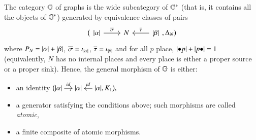 \begin{definition}
    The category $\mathbb G$ of graphs is the wide subcategory  of ${\mathbb G}^*$ (that is, it contains all the objects of ${\mathbb G}^*$) generated by equivalence classes of pairs
    \[
    \bigl(
    \begin{tikzcd}
    \length\alpha \ar[r,"\overline\sigma"] & N & \ar[l,"\overline\tau"'] \length\beta
    \end{tikzcd},
    \Delta_N  \bigr)
    \]
    where $P_N=\lvert \alpha \rvert + \lvert \beta \rvert$, $\overline\sigma=\iota_{\lvert \alpha \rvert}$, $\overline\tau = \iota_{\lvert \beta \rvert}$ and for all $p$ place, $\length{\inp p} + \length{\out p} = 1$ (equivalently, $N$ has no internal places and every place is either a proper source or a proper sink). Hence, the general morphism of $\mathbb G$ is either:
    \begin{itemize}
        \item an identity 
        $
        \bigl( 
        \begin{tikzcd}[cramped,sep=small]
        \length\alpha \ar[r,"\id{}"] & \length\alpha & \ar[l,"\id{}"'] \length\alpha
        \end{tikzcd},
        K_1
        \bigr),
        $
        \item a generator satisfying the conditions above; such morphisms are called \emph{atomic},
        \item a finite composite of atomic morphisms. 
    \end{itemize}
\end{definition}

